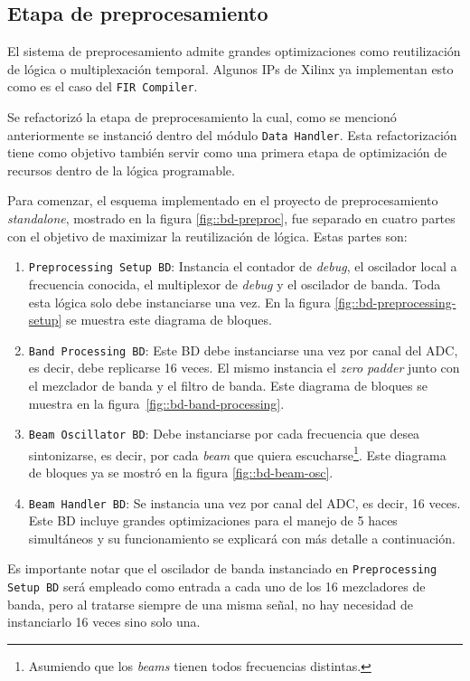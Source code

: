 \documentclass[../../main.tex]{subfiles}
\begin{document}
\subsection{Etapa de preprocesamiento}\label{subsec::preproc-opt}
El sistema de preprocesamiento admite grandes optimizaciones como reutilización de lógica o multiplexación temporal. Algunos IPs de Xilinx ya implementan esto como es el caso del \texttt{FIR Compiler}\cite{fir-compiler}.

Se refactorizó la etapa de preprocesamiento la cual, como se mencionó anteriormente se instanció dentro del módulo \texttt{Data Handler}. Esta refactorización tiene como objetivo también servir como una primera etapa de optimización de recursos dentro de la lógica programable. 

Para comenzar, el esquema implementado en el proyecto de preprocesamiento \textit{standalone}, mostrado en la figura \ref{fig::bd-preproc}, fue separado en cuatro partes con el objetivo de maximizar la reutilización de lógica. Estas partes son:
\begin{enumerate}
    \item \texttt{Preprocessing Setup BD}: Instancia el contador de \textit{debug}, el oscilador local a frecuencia conocida, el multiplexor de \textit{debug} y el oscilador de banda. Toda esta lógica solo debe instanciarse una vez. En la figura \ref{fig::bd-preprocessing-setup} se muestra este diagrama de bloques.
    \item \texttt{Band Processing BD}: Este BD debe instanciarse una vez por canal del ADC, es decir, debe replicarse 16 veces. El mismo instancia el \textit{zero padder} junto con el mezclador de banda y el filtro de banda. Este diagrama de bloques se muestra en la figura~\ref{fig::bd-band-processing}.
    \item \texttt{Beam Oscillator BD}: Debe instanciarse por cada frecuencia que desea sintonizarse, es decir, por cada \textit{beam} que quiera escucharse\footnote{Asumiendo que los \textit{beams} tienen todos frecuencias distintas.}. Este diagrama de bloques ya se mostró en la figura \ref{fig::bd-beam-osc}.
    \item \texttt{Beam Handler BD}: Se instancia una vez por canal del ADC, es decir, 16 veces. Este BD incluye grandes optimizaciones para el manejo de 5 haces simultáneos y su funcionamiento se explicará con más detalle a continuación.
\end{enumerate}

Es importante notar que el oscilador de banda instanciado en \texttt{Preprocessing Setup BD} será empleado como entrada a cada uno de los 16 mezcladores de banda, pero al tratarse siempre de una misma señal, no hay necesidad de instanciarlo 16 veces sino solo una.
\end{document}
